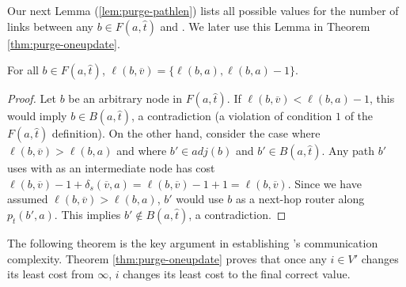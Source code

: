{{Our next Lemma (\ref{lem:purge-pathlen}) lists all possible values for the number of links between any $b \in F(a,\hat{t})$ and \bads.  We later use this Lemma in
Theorem \ref{thm:purge-oneupdate}.

\begin{lemma}
\label{lem:purge-pathlen}
For all $b \in F(a,\hat{t})$, $\ell(b,\overline{v}) = \{\ell(b,a), \ell(b,a) - 1\}$.
\end{lemma}
\begin{proof}
Let $b$ be an arbitrary node in $F(a,\hat{t})$.
If $\ell(b,\overline{v}) < \ell(b,a) -1$, this would imply $b \in B(a,\hat{t})$, a contradiction (a violation of condition $1$ of the $F(a,\hat{t})$ definition).  
On the other hand, consider the case where $\ell(b,\overline{v}) > \ell(b,a)$ and where $b' \in adj(b)$ and $b' \in B(a,\hat{t})$.  
Any path $b'$ uses with \bad as an intermediate node has cost
$\ell(b,\overline{v}) -1 + \delta_s(\overline{v},a)  = \ell(b,\overline{v}) -1 + 1 =  \ell(b,\overline{v})$.  Since we have assumed $\ell(b,\overline{v})> \ell(b,a)$,
$b'$ would use $b$ as a next-hop router along $p_{\hat{t}}(b',a)$. 
This implies $b'\notin B(a,\hat{t})$, a contradiction. 
\end{proof}

The following theorem is the key argument in establishing \purges's communication complexity.  Theorem \ref{thm:purge-oneupdate} proves that once any $i \in V'$ changes its least cost 
from $\infty$, $i$ changes its least cost to the final correct value.

}}
